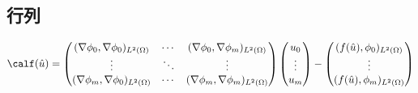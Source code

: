\subsection{行列}
\begin{equation}
  \calf(\hat{u})=
  \begin{pmatrix}
    (\nabla\phi_0, \nabla\phi_0)_{L^2(\Omega)} & \cdots & (\nabla\phi_0, \nabla\phi_m)_{L^2(\Omega)} \\
    \vdots & \ddots & \vdots \\
    (\nabla\phi_m, \nabla\phi_0)_{L^2(\Omega)} & \cdots & (\nabla\phi_m, \nabla\phi_m)_{L^2(\Omega)}
  \end{pmatrix}
  \begin{pmatrix}
    u_0 \\
    \vdots \\
    u_m
  \end{pmatrix}
  -
  \begin{pmatrix}
    (f(\hat{u}), \phi_0)_{L^2(\Omega)} \\
    \vdots \\
    (f(\hat{u}), \phi_m)_{L^2(\Omega)}
  \end{pmatrix}
\end{equation}
